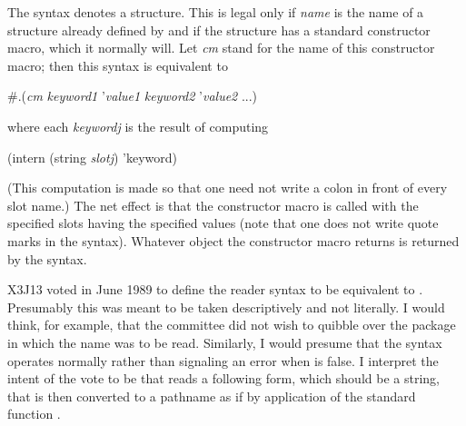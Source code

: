 \begin{flushdesc}
\item[\cd{\#S}]
The syntax 
denotes a structure.  This is legal only if \emph{name} is the name
of a structure already defined by  and if the
structure has a standard constructor macro, which it normally will.
Let \emph{cm} stand for the name of this constructor macro;
then this syntax is equivalent to
\begin{lisp}
\#.(\emph{cm} \emph{keyword1} '\emph{value1} \emph{keyword2} '\emph{value2} ...)
\end{lisp}
where each \emph{keywordj} is the result of computing
\begin{lisp}
(intern (string \emph{slotj}) 'keyword)
\end{lisp}
(This computation is made so that one need not write a colon in
front of every slot name.)
The net effect is that the constructor macro is called
with the specified slots
having the specified values (note that one does not write quote marks
in the  syntax).  Whatever object the constructor macro returns
is returned by the  syntax.
\end{flushdesc}

\begin{newer}
\begin{flushdesc}
\item[\cd{\#P}]
X3J13 voted in June 1989 
to define the reader syntax  to be equivalent to
.  Presumably this was meant to
be taken descriptively and not literally.  I would think, for example,
that the committee did not wish to quibble over the package in which
the name  was to be read.  Similarly, I would
presume that the  syntax operates normally rather than signaling
an error when  is false.  I interpret the intent
of the vote to be that  reads a following form, which should be
a string, that is then converted to a pathname as if by application
of the standard function .
\end{flushdesc}
\end{newer}


